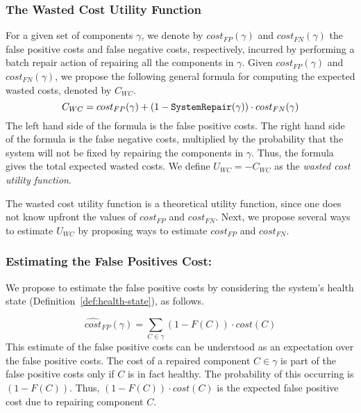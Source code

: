 \documentclass[letterpaper]{article}
\newcommand\meir[1]{\textcolor{red}{meir: #1}}
\newcommand\sysrep[1]{{\tt SystemRepair(#1)}}
\begin{document}
\subsubsection{The Wasted Cost Utility Function}
For a given set of components $\gamma$, we denote by $cost_{FP}(\gamma)$ and $cost_{FN}(\gamma)$ the false positive costs and false negative costs, respectively, incurred by performing a batch repair action of repairing all the components in $\gamma$. Given $cost_{FP}(\gamma)$ and $cost_{FN}(\gamma)$, we propose the following general formula for computing the expected wasted costs, denoted by $C_{WC}$.
\[ C_{WC}=cost_{FP}(\gamma)+(1-\sysrep{\gamma})\cdot cost_{FN}(\gamma)\]
The left hand side of the formula is the false positive costs. The right hand side of the formula is the false negative costs, multiplied by the probability that the system will not be fixed by repairing the components in $\gamma$. Thus, the formula gives the total expected wasted costs.
We define $U_{WC}=-C_{WC}$ as the {\em wasted cost utility function}.



The wasted cost utility function is a theoretical utility function, since one does not know upfront the values of $cost_{FP}$ and $cost_{FN}$. Next, we propose several ways to estimate $U_{WC}$ by proposing ways to estimate $cost_{FP}$ and $cost_{FN}$.


\subsubsection{Estimating the False Positives Cost:}
We propose to estimate the false positive costs by considering the system's health state (Definition~\ref{def:health-state}), as follows.

\[ \widehat{cost}_{FP}(\gamma)=\sum_{C\in \gamma} (1-F(C))\cdot cost(C) \]
This estimate of the false positive costs can be understood as an expectation over the false positive costs. The cost of a repaired component $C\in\gamma$ is part of the false positive costs only if $C$ is in fact healthy. The probability of this occurring is $(1-F(C))$. Thus, $(1-F(C))\cdot cost(C)$ is the expected false positive cost due to repairing component $C$.
\end{document}
